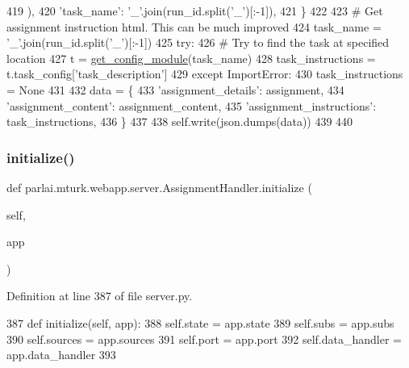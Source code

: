 \begin{DoxyCode}
419             ),
420             \textcolor{stringliteral}{'task\_name'}: \textcolor{stringliteral}{'\_'}.join(run\_id.split(\textcolor{stringliteral}{'\_'})[:-1]),
421         \}
422 
423         \textcolor{comment}{# Get assignment instruction html. This can be much improved}
424         task\_name = \textcolor{stringliteral}{'\_'}.join(run\_id.split(\textcolor{stringliteral}{'\_'})[:-1])
425         \textcolor{keywordflow}{try}:
426             \textcolor{comment}{# Try to find the task at specified location}
427             t = \hyperlink{namespaceparlai_1_1mturk_1_1webapp_1_1server_aee065cfdb6346d4815762ae793427f1e}{get\_config\_module}(task\_name)
428             task\_instructions = t.task\_config[\textcolor{stringliteral}{'task\_description'}]
429         \textcolor{keywordflow}{except} ImportError:
430             task\_instructions = \textcolor{keywordtype}{None}
431 
432         data = \{
433             \textcolor{stringliteral}{'assignment\_details'}: assignment,
434             \textcolor{stringliteral}{'assignment\_content'}: assignment\_content,
435             \textcolor{stringliteral}{'assignment\_instructions'}: task\_instructions,
436         \}
437 
438         self.write(json.dumps(data))
439 
440 
\end{DoxyCode}
\mbox{\label{classparlai_1_1mturk_1_1webapp_1_1server_1_1AssignmentHandler_a4d6fc0f6605557f5ede04d06db680640}} 
\subsubsection{\texorpdfstring{initialize()}{initialize()}}
{\footnotesize\ttfamily def parlai.\+mturk.\+webapp.\+server.\+Assignment\+Handler.\+initialize (\begin{DoxyParamCaption}\item[{}]{self,  }\item[{}]{app }\end{DoxyParamCaption})}



Definition at line 387 of file server.\+py.


\begin{DoxyCode}
387     \textcolor{keyword}{def }initialize(self, app):
388         self.state = app.state
389         self.subs = app.subs
390         self.sources = app.sources
391         self.port = app.port
392         self.data\_handler = app.data\_handler
393 
\end{DoxyCode}


